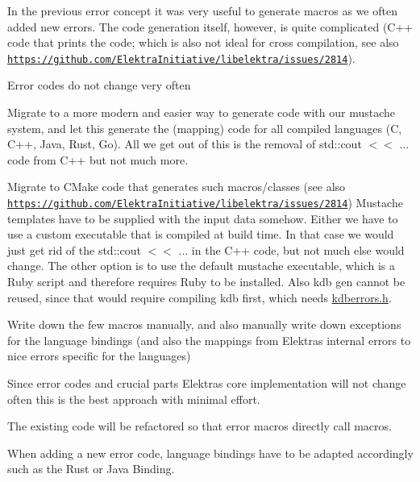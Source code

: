 In the previous error concept it was very useful to generate macros as we often added new errors. The code generation itself, however, is quite complicated (C++ code that prints the code; which is also not ideal for cross compilation, see also \href{https://github.com/ElektraInitiative/libelektra/issues/2814}{\tt https\+://github.\+com/\+Elektra\+Initiative/libelektra/issues/2814}).


\begin{DoxyItemize}
\item Error codes do not change very often
\end{DoxyItemize}


\begin{DoxyItemize}
\item Migrate to a more modern and easier way to generate code with our mustache system, and let this generate the (mapping) code for all compiled languages (C, C++, Java, Rust, Go). All we get out of this is the removal of {\ttfamily std\+::cout $<$$<$ ...} code from C++ but not much more.
\item Migrate to C\+Make code that generates such macros/classes (see also \href{https://github.com/ElektraInitiative/libelektra/issues/2814}{\tt https\+://github.\+com/\+Elektra\+Initiative/libelektra/issues/2814}) Mustache templates have to be supplied with the input data somehow. Either we have to use a custom executable that is compiled at build time. In that case we would just get rid of the std\+::cout $<$$<$ ... in the C++ code, but not much else would change. The other option is to use the default mustache executable, which is a Ruby script and therefore requires Ruby to be installed. Also kdb gen cannot be reused, since that would require compiling kdb first, which needs \hyperlink{kdberrors_8h}{kdberrors.\+h}.
\end{DoxyItemize}

Write down the few macros manually, and also manually write down exceptions for the language bindings (and also the mappings from Elektra\textquotesingle{}s internal errors to nice errors specific for the languages)

Since error codes and crucial parts Elektra\textquotesingle{}s core implementation will not change often this is the best approach with minimal effort.

The existing code will be refactored so that error macros directly call macros.

When adding a new error code, language bindings have to be adapted accordingly such as the Rust or Java Binding.


